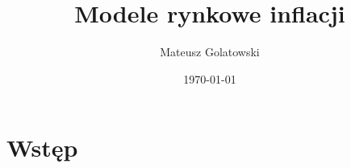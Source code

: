 \documentclass{mini}
\title{Modele rynkowe inflacji}
\author{Mateusz Golatowski}
\date{\today}
\theoremstyle{mythstyle}
\begin{document}
\maketitle
\tableofcontents

\chapter*{Wstęp}
%	
%	
%	
%	
%	
%	
%	
%		
%		
\end{document}
